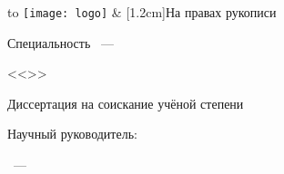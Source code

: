 \thispagestyle{empty}
\begin{center}
\thesisOrganization
\end{center}


\vspace{0pt plus2fill} %

\noindent
\begin{tabu} to\linewidth {X[l,p]X[r,p]}
    \texttt{[image: logo]}
    &
    [1.2cm]{На правах рукописи} \\
\end{tabu}


\vspace{0pt plus6fill} %
\begin{center}%
    {\large \thesisAuthor}
\end{center}%
%
\vspace{0pt plus1fill} %
\begin{center}%
    \textbf {\large %
        \thesisTitle}
    
    \vspace{0pt plus2fill} %
    {%
        Специальность \thesisSpecialtyNumber~---
        
        <<\thesisSpecialtyTitle>>
    }
    
    \vspace{0pt plus2fill} %
    Диссертация на соискание учёной степени
    
    \thesisDegree
\end{center}%
%
\vspace{0pt plus4fill} %
\begin{flushright}%
    Научный руководитель:
    
    \supervisorRegalia
    
    \supervisorFio
\end{flushright}%
%
\vspace{0pt plus4fill} %
\begin{center}%
    {\thesisCity~--- \thesisYear}
\end{center}%